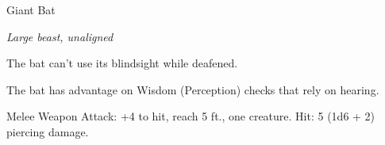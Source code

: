 \begin{monsterbox}{Giant Bat}
\begin{hangingpar}
\textit{Large beast, unaligned}
\end{hangingpar}
\dndline%
\basics[%
armorclass = 13,
hitpoints = 4d10,
speed = {10 ft., fly 60 ft.}
]
\dndline%
\stats[%
STR = \stat{15},
DEX = \stat{16},
CON = \stat{11},
INT = \stat{2},
WIS = \stat{12},
CHA = \stat{6}
]
\dndline%
\details[%
skills={},
damageimmunities={},
savingthrows={},
conditionimmunities={},
damageresistances={},
damagevulnerabilities={},
senses={blindsight 60 ft., passive Perception 11},
challenge=1/4
]
\dndline%
\begin{monsteraction}[Echolocation]
The bat can't use its blindsight while deafened.
\end{monsteraction}
\begin{monsteraction}
The bat has advantage on Wisdom (Perception) checks that rely on hearing.
\end{monsteraction}
\begin{monsteraction}[Bite]
Melee Weapon Attack: +4 to hit, reach 5 ft., one creature. Hit: 5 (1d6 + 2) piercing damage.
\end{monsteraction}
\end{monsterbox}
